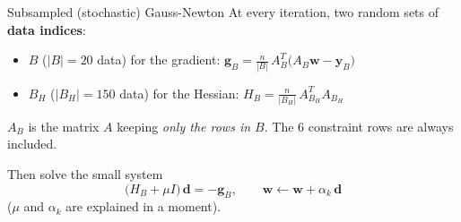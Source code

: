 \documentclass[10pt,aspectratio=169]{beamer}
\newcommand{\hl}[1]{\textcolor{accent}{\textbf{#1}}}
\begin{document}
\begin{frame}{Subsampled (stochastic) Gauss-Newton}
  At every iteration, two random sets of \hl{data indices}:
  \begin{itemize}
    \item $B$ ($|B| = 20$ data) for the gradient:
          \;$\displaystyle \bm{g}_B = \frac{n}{|B|}\, A_B^T\big(A_B\bm{w} - \bm{y}_B\big)$
    \item $B_H$ ($|B_H| = 150$ data) for the Hessian:
          \;$\displaystyle H_B = \frac{n}{|B_H|}\, A_{B_H}^T A_{B_H}$
  \end{itemize}
  $A_B$ is the matrix $A$ keeping \emph{only the rows in $B$}.
  The 6 constraint rows are always included.
  \vspace{0.5em}

  Then solve the small system
  \[
    \big(H_B + \mu I\big)\,\bm{d} = -\bm{g}_B, \qquad
    \bm{w} \leftarrow \bm{w} + \alpha_k\,\bm{d}
  \]
  ($\mu$ and $\alpha_k$ are explained in a moment).
\end{frame}
\end{document}
